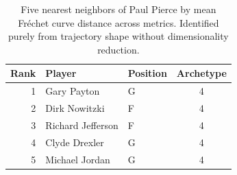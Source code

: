 \begin{table}[htbp]
  \centering\small
  \begin{tabular}{rllc}
    \toprule
    Rank & Player & Position & Archetype \\
    \midrule
    1 & Gary Payton & G & 4 \\
    2 & Dirk Nowitzki & F & 4 \\
    3 & Richard Jefferson & F & 4 \\
    4 & Clyde Drexler & G & 4 \\
    5 & Michael Jordan & G & 4 \\
    \bottomrule
  \end{tabular}
  \caption{Five nearest neighbors of Paul Pierce by mean Fr\'{e}chet curve distance across metrics. Identified purely from trajectory shape without dimensionality reduction.}
  \label{tab:Paul_Pierce_frechet_curve_neighbors}
\end{table}

